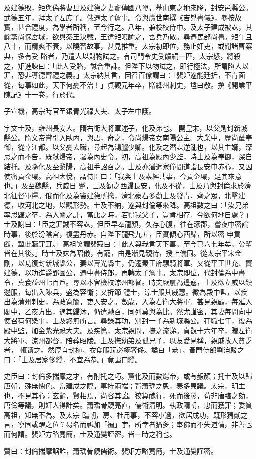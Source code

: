 \begin{pinyinscope}
 及建德敗，矩與偽將曹旦及建德之妻齎傳國八璽，舉山東之地來降，封安邑縣公。武德五年，拜太子左庶子。俄遷太子詹事。令與虞世南撰《吉兇書儀》，參按故實，甚合禮度，為學者所稱，至今行之。八年，兼檢校侍中。及太子建成被誅，其餘黨尚保宮城，欲與秦王決戰，王遣矩曉諭之，宮兵乃散。尋遷民部尚書。矩年且八十，而精爽不衰，以曉習故事，甚見推重。太宗初即位，務止奸吏，或聞諸曹案典，多有受
 賂者，乃遣人以財物試之。有司門令史受饋絹一匹，太宗怒，將殺之，矩進諫曰：「此人受賂，誠合重誅。但陛下以物試之，即行極法，所謂陷人以罪，恐非導德齊禮之義。」太宗納其言，因召百僚謂曰：「裴矩遂能廷折，不肯面從，每事如此，天下何憂不治！」貞觀元年卒，贈絳州刺史，謚曰敬。撰《開業平陳記》十一卷，行於代。



 子宣機，高宗時官至銀青光祿大夫、太子左中護。



 宇文士及，雍州長安人。隋右衛大將軍述子，化及弟也。
 開皇末，以父勛封新城縣公。隋文帝嘗引入臥內，與語，奇之，令尚煬帝女南陽公主。大業中，歷尚輦奉御，從幸江都。以父憂去職，尋起為鴻臚少卿。化及之潛謀逆亂也，以其主婿，深忌之而不告，既弒煬帝，署為內史令。初，高祖為殿內少監，時士及為奉御，深自結托。及隨化及至黎陽，高祖手詔召之。士及亦潛遣家僮間道詣長安申赤心，又因使密貢金環。高祖大悅，謂侍臣曰：「我與士及素經共事，今貢金環，是其來意也。」及至魏縣，兵威日
 蹙，士及勸之西歸長安，化及不從，士及乃與封倫求於濟北征督軍糧。俄而化及為竇建德所擒，濟北豪右多勸士及發青、齊之眾，北擊建德，收河北之地，以觀形勢。士及不納，遂與封倫等來降。高祖數之曰：「汝兄弟率思歸之卒，為入關之計，當此之時，若得我父子，豈肯相存，今欲何地自處？」士及謝曰：「臣之罪誠不容誅，但臣早奉龍顏，久存心腹，往在涿郡，嘗夜中密論時事，後於汾陰宮，復盡丹赤。自陛下龍飛九五，臣實傾心西歸，所以密
 申貢獻，冀此贖罪耳。」高祖笑謂裴寂曰：「此人與我言天下事，至今已六七年矣，公輩皆在其後。」時士及妹為昭儀，有寵，由是漸見親待，授上儀同。從太宗平宋金剛，以功復封新城縣公，妻以壽光縣主，仍遷秦王府驃騎將軍。又從平王世充、竇建德，以功進爵郢國公，遷中書侍郎，再轉太子詹事。太宗即位，代封倫為中書令，真食益州七百戶。尋以本官檢校涼州都督。時突厥屢為邊寇，士及欲立威以鎮邊服，每出入陳兵，盛為容衛；又折節
 禮士，涼士服其威惠。徵為殿中監，以疾出為蒲州刺史，為政寬簡，吏人安之。數歲，入為右衛大將軍，甚見親顧，每延入閣中，乙夜方出，遇其歸沐，仍遣馳召，同列莫與為比。然尤謹密，其妻每問向中使召有何樂事，士及終無所言。尋錄其功，別封一子為新城縣公。在職七年，復為殿中監，加金紫光祿大夫。及疾篤，太宗親問，撫之流涕。貞觀十六年卒，贈左衛大將軍、涼州都督，陪葬昭陵。士及撫幼弟及孤兄子，以友愛見稱，親戚故人貧乏者，
 輒遺之。然厚自封植，衣食服玩必極奢侈。謚曰「恭」，黃門侍郎劉洎駁之曰：「士及居家侈縱，不宜為恭。」竟謚曰縱。



 史臣曰：封倫多揣摩之才，有附托之巧。黨化及而數煬帝，或有赧顏；托士及以歸唐朝，殊無愧色。當建成之際，事持兩端；背蕭瑀之恩，奏多異議。太宗，明主也，不見其心；玄齡，賢相焉，尚容其諂。狡算醜行，死而後彰，茍非唐臨之劾，唐儉等議，則奸人得計矣。蕭瑀骨鯁亮直，儒術清明。執政隋朝，忠而獲罪；委質高祖，知無不為。及太宗
 臨朝，房、杜用事，不容小過，欲居成功，既形猜貳之言，寧固或躍之位？易名而祗加「褊」字，所幸者猶多；奉佛而不失道情，非善也而何謂。裴矩方略寬簡，士及通變謹密，皆一時之稱也。



 贊曰：封倫揣摩諂詐，蕭瑀骨鯁儒術。裴矩方略寬簡，士及通變謹密。



\end{pinyinscope}